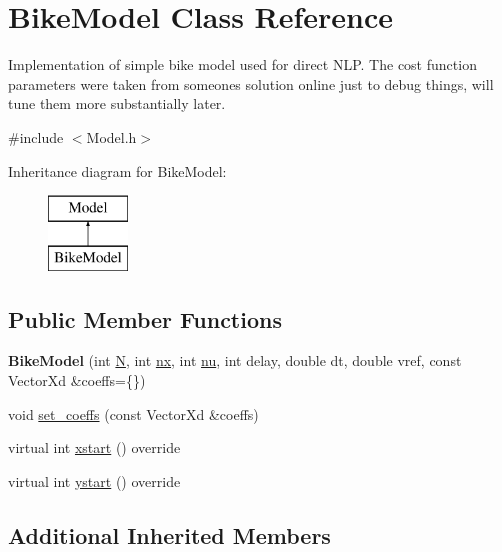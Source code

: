 \hypertarget{classBikeModel}{}\section{Bike\+Model Class Reference}
\label{classBikeModel}


Implementation of simple bike model used for direct N\+LP. The cost function parameters were taken from someone\textquotesingle{}s solution online just to debug things, will tune them more substantially later.  




{\ttfamily \#include $<$Model.\+h$>$}

Inheritance diagram for Bike\+Model\+:\begin{figure}[H]
\begin{center}
\leavevmode
\includegraphics[height=2.000000cm]{classBikeModel}
\end{center}
\end{figure}
\subsection*{Public Member Functions}
\begin{DoxyCompactItemize}
\item 
\mbox{\label{classBikeModel_a66013cb6adbd9d439f63a4537a9aac23}} 
{\bfseries Bike\+Model} (int \mbox{\hyperlink{classModel_aca776f8a10906afa8a5c362034727921}{N}}, int \mbox{\hyperlink{classModel_a951f42de158e872b5affece79521b968}{nx}}, int \mbox{\hyperlink{classModel_a0afbb992dab28ae89f1b0b114d65689c}{nu}}, int delay, double dt, double vref, const Vector\+Xd \&coeffs=\{\})
\item 
void \mbox{\hyperlink{classBikeModel_a697e6ec00a4a38ca844c491041cc9b86}{set\+\_\+coeffs}} (const Vector\+Xd \&coeffs)
\item 
virtual int \mbox{\hyperlink{classBikeModel_a920787379d6fef804f46bc1f3f885a89}{xstart}} () override
\item 
virtual int \mbox{\hyperlink{classBikeModel_a05b988f106df902d1222dfb662d4b1fa}{ystart}} () override
\end{DoxyCompactItemize}
\subsection*{Additional Inherited Members}


